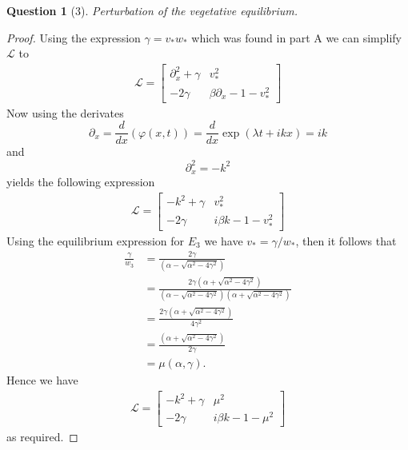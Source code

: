 \documentclass[11pt]{article}
\theoremstyle{quest}
\newtheorem*{question}{Question}
\newcommand{\Dp}{\partial}
\newcommand{\Bl}{\mathcal{L}}
\begin{document}
\begin{question}[3]
    Perturbation of the vegetative equilibrium. 
\end{question}
\begin{proof}
    Using the expression $\gamma = v_* w_*$ which was found in part A we can simplify $\Bl$
    to 
    \begin{align*}
        \Bl =
        \begin{bmatrix}
            \Dp_x^2 + \gamma & v_*^2\\
            - 2\gamma & \beta \Dp_x -1  -v_*^2
        \end{bmatrix}
    \end{align*}
    Now using the derivates $$\Dp_x = \frac{d}{dx}( \varphi(x,t) ) = \frac{d}{dx} \exp{ \left( \lambda t+ i k x  \right)  } = ik$$ 
    and $$ \Dp_x^2 = -k^2$$ 
    yields the following expression
    \begin{align*}
        \Bl =
        \begin{bmatrix}
            -k^2 + \gamma & v_*^2\\
            - 2\gamma & i\beta k  -1  -v_*^2
        \end{bmatrix}
    \end{align*}
    Using the equilibrium expression for $E_3$ we have $v_* = \gamma/ w_*$, then it follows that
    \begin{align*}
        \frac{\gamma}{w_3} &= \frac{ 2 \gamma }{(\alpha - \sqrt{ \alpha^2 - 4 \gamma^2 })} \\
                           &= \frac{2 \gamma (\alpha + \sqrt{ \alpha^2 - 4 \gamma^2 })}{(\alpha - \sqrt{ \alpha^2 - 4 \gamma^2 })(\alpha + \sqrt{ \alpha^2 - 4 \gamma^2 })} \\
                           &= \frac{ 2 \gamma (\alpha + \sqrt{ \alpha^2 - 4 \gamma^2 }) }{4\gamma^2} \\
                           &= \frac{(\alpha + \sqrt{ \alpha^2 - 4 \gamma^2 }) }{2 \gamma} \\ 
                           &= \mu(\alpha, \gamma).
    \end{align*}
    Hence we have
    \begin{align*}
        \Bl =
        \begin{bmatrix}
            -k^2 + \gamma & \mu^2\\
            - 2\gamma & i\beta k  -1  -\mu^2
        \end{bmatrix}
    \end{align*}
    as required.
\end{proof}
\end{document}
